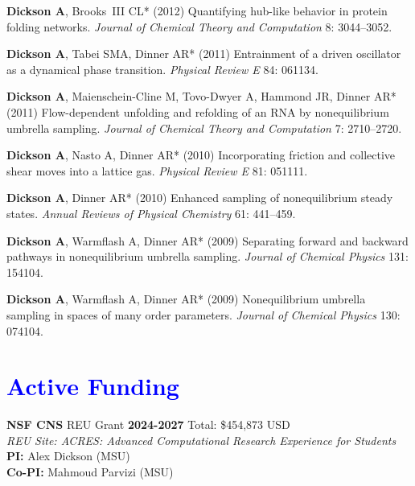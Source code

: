 \documentclass[margin,line]{res}
\begin{document}
\begin{resume}
\begin{spacing}{1.2}
\begin{thebibliography}{10}
{\bf Dickson A}, Brooks~{III} CL* (2012) Quantifying hub-like behavior in protein
  folding networks.
\newblock \textit{Journal of Chemical Theory and Computation} 8: 3044--3052.

{\bf Dickson A}, Tabei SMA, Dinner AR* (2011) {Entrainment of a driven oscillator as a
  dynamical phase transition}.
\newblock \textit{Physical Review E} 84: 061134.

{\bf Dickson A}, Maienschein-Cline M, Tovo-Dwyer A, Hammond JR, Dinner AR* (2011)
  Flow-dependent unfolding and refolding of an {RNA} by nonequilibrium umbrella
  sampling.
\newblock \textit{Journal of Chemical Theory and Computation} 7: 2710--2720.

{\bf Dickson A}, Nasto A, Dinner AR* (2010) {Incorporating friction and collective
  shear moves into a lattice gas.}
\newblock \textit{Physical Review E} 81: 051111.

{\bf Dickson A}, Dinner AR* (2010) Enhanced sampling of nonequilibrium steady states.
\newblock \textit{Annual Reviews of Physical Chemistry} 61: 441--459.

{\bf Dickson A}, Warmflash A, Dinner AR* (2009) Separating forward and backward
  pathways in nonequilibrium umbrella sampling.
\newblock \textit{Journal of Chemical Physics} 131: 154104.

{\bf Dickson A}, Warmflash A, Dinner AR* (2009) Nonequilibrium umbrella sampling in
  spaces of many order parameters.
\newblock \textit{Journal of Chemical Physics} 130: 074104.

\end{thebibliography}
\end{spacing}
\endgroup

\section{\sc \textcolor{blue}{Active Funding} }

{\bf NSF CNS} REU Grant \hfill {\bf 2024-2027} Total: \$454,873 USD \\
\emph{REU Site: ACRES: Advanced Computational Research Experience for Students}\\
     {\bf PI:} Alex Dickson (MSU) \\
     {\bf Co-PI:} Mahmoud Parvizi (MSU) 


\end{resume}
\end{document}
